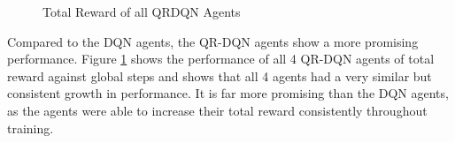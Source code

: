 \begin{figure}[H]
    \centering
    \caption{Total Reward of all QRDQN Agents}
    \label{fig:QRDQN_total_reward}
\end{figure}

Compared to the DQN agents, the QR-DQN agents show a more promising performance. Figure \ref{fig:QRDQN_total_reward} shows the performance of all 4 QR-DQN agents of total reward against global steps and shows that all 4 agents had a very similar but consistent growth in performance. It is far more promising than the DQN agents, as the agents were able to increase their total reward consistently throughout training.

